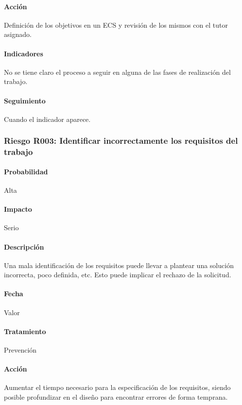 \documentclass[10pt,a4paper]{article}
\begin{document}
				\paragraph{Acción} Definición de los objetivos en un ECS y revisión de los mismos con el tutor asignado. %
				\paragraph{Indicadores} No se tiene claro el proceso a seguir en alguna de las fases de realización del trabajo. %
				\paragraph{Seguimiento}	Cuando el indicador aparece. %
				
			\subsubsection{Riesgo R003: Identificar incorrectamente los requisitos del trabajo }
				\paragraph{Probabilidad} Alta
				\paragraph{Impacto}	Serio
				\paragraph{Descripción} Una mala identificación de los requisitos puede llevar a plantear una solución incorrecta, poco definida, etc. Esto puede implicar el rechazo de la solicitud.
				\paragraph{Fecha} Valor %
				\paragraph{Tratamiento} Prevención %
				\paragraph{Acción} Aumentar el tiempo necesario para la especificación de los requisitos, siendo posible profundizar en el diseño para encontrar errores de forma temprana. %
\end{document}
